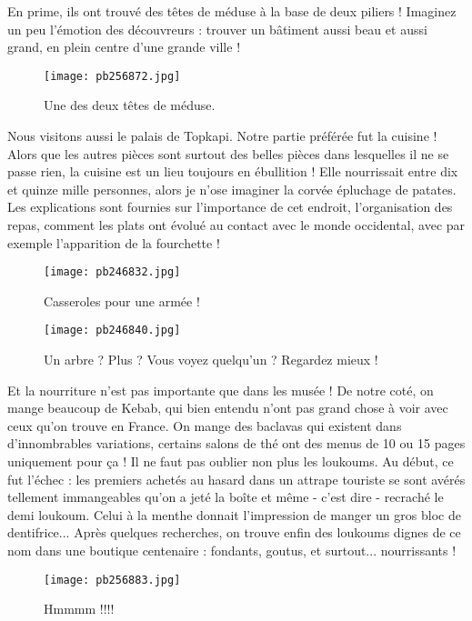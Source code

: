 \documentclass{book}
\begin{document}
En prime, ils ont trouvé des têtes de méduse à la base de deux piliers ! Imaginez un peu l'émotion des découvreurs : trouver un bâtiment aussi beau et aussi grand, en plein centre d'une grande ville !


\begin{figure}[h]
\centering
\texttt{[image: pb256872.jpg]}
\caption*{Une des deux têtes de méduse.}
\end{figure}

Nous visitons aussi le palais de Topkapi. Notre partie préférée fut la cuisine ! Alors que les autres pièces sont surtout des belles pièces dans lesquelles il ne se passe rien, la cuisine est un lieu toujours en ébullition ! Elle nourrissait entre dix et quinze mille personnes, alors je n'ose imaginer la corvée épluchage de patates. Les explications sont fournies sur l'importance de cet endroit, l'organisation des repas, comment les plats ont évolué au contact avec le monde occidental, avec par exemple l'apparition de la fourchette !


\begin{figure}[h]
\centering
\texttt{[image: pb246832.jpg]}
\caption*{Casseroles pour une armée !}
\end{figure}


\begin{figure}[h]
\centering
\texttt{[image: pb246840.jpg]}
\caption*{Un arbre ? Plus ? Vous voyez quelqu'un ? Regardez mieux !}
\end{figure}

Et la nourriture n'est pas importante que dans les musée ! De notre coté, on mange beaucoup de Kebab, qui bien entendu n'ont pas grand chose à voir avec ceux qu'on trouve en France. On mange des baclavas qui existent dans d'innombrables variations, certains salons de thé ont des menus de 10 ou 15 pages uniquement pour ça ! Il ne faut pas oublier non plus les loukoums. Au début, ce fut l'échec : les premiers achetés au hasard dans un attrape touriste se sont avérés tellement immangeables qu'on a jeté la boîte et même - c'est dire - recraché le demi loukoum. Celui à la menthe donnait l'impression de manger un gros bloc de dentifrice... Après quelques recherches, on trouve enfin des loukoums dignes de ce nom dans une boutique centenaire : fondants, goutus, et surtout... nourrissants !


\begin{figure}[h]
\centering
\texttt{[image: pb256883.jpg]}
\caption*{Hmmmm !!!!}
\end{figure}
\end{document}
